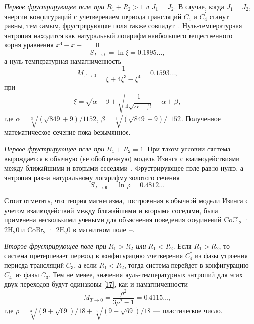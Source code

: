 \emph{Первое фрустрирующее поле при $R_1 + R_2 > 1$ и $J_1 = J_2$}. В случае, когда $J_1 = J_2$, энергии конфигураций с учетверением периода трансляций $C_4$ и $C_4^{'}$ станут равны, тем самым, фрустрирующие поля также совпадут~\cite{zarubin2019}. Нуль-температурная энтропия находится как натуральный логарифм наибольшего вещественного корня уравнения $x^4-x-1=0$
\begin{equation}
S_{T\rightarrow 0} = \ln \xi = 0.1995\dots,
\label{18}
\end{equation}
а нуль-температурная намагниченность
\begin{equation}
M_{T\rightarrow 0} = \frac{1}{\xi+4\xi^3-\xi^4} = 0.1593\dots,
\label{19}
\end{equation}
при 
\begin{equation*}
\xi = \sqrt{\alpha- \beta} + \sqrt{\frac{1}{4\sqrt{\alpha - \beta}}-\alpha+\beta},
\end{equation*}
где $\alpha = \sqrt[3]{(\sqrt{849}+9)/1152}$, $\beta = \sqrt[3]{(\sqrt{849}-9)/1152}$.
Полученное математическое сечение пока безымянное.

\emph{Первое фрустрирующее поле при $R_1 + R_2 = 1$}. При таком условии система вырождается в обычную (не обобщенную)
модель Изинга с взаимодействиями между ближайшими и вторыми соседями~\cite{zarubin2019}. Фрустрирующее поле равно нулю, а энтропия равна натуральному логарифму золотого сечения 
\begin{equation}
S_{T\rightarrow 0} = \ln \varphi = 0.4812\dots
\label{20}
\end{equation}

Стоит отметить, что теория магнетизма, построенная в обычной модели Изинга с учетом взаимодействий между ближайшими и вторыми соседями, была применена несколькими учеными для объяснения поведения соединений CoCl$_2$ ·$2$H$_2$0 и CoBr$_2$ · $2$H$_2$0 в магнитном поле~\cite{oguchi1965}--\cite{kobayashi1964}.

\emph{Второе фрустрирующее поле при $R_1 > R_2$ или $R_1 < R_2$}. Если $R_1 > R_2$, то система претерпевает переход в конфигурацию учетверения $C_4^{''}$ из фазы утроения периода трансляций $C_3$, а если $R_1 < R_2$, тогда система перейдет в конфигурацию $C_{4}^{'''}$ из фазы $C_3$.
Тем не менее, значения нуль-температурных энтропий для этих двух переходов будут одинаковы \eqref{17}, как и намагниченности
\begin{equation}
M_{T\rightarrow 0} = \frac{\rho^2}{3\rho^2-1} = 0.4115\dots,
\label{21}
\end{equation}
где $\rho = \sqrt[3]{(9+\sqrt{69})/18}+\sqrt[3]{(9-\sqrt{69})/18}$ --- пластическое число.

